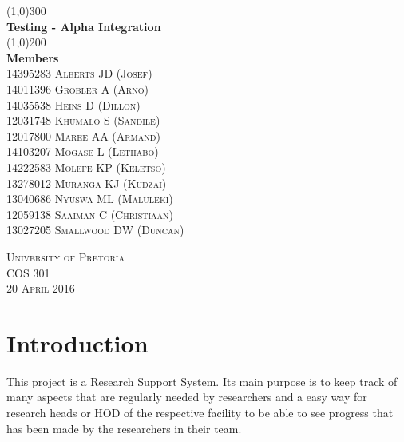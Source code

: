 \documentclass{article}
\begin{document}
\begin{titlepage}
	\begin{center}
		\line(1,0){300}\\
		[6mm]
		\huge{\bfseries Testing - Alpha Integration}\\
		[2mm]
		\line(1,0){200}\\
		[15mm]
		\textbf{\huge Members}\\
		[7.5mm]
		\textsc{
                \large 14395283	Alberts	JD (Josef)\\
                14011396	Grobler	A (Arno) \\
				14035538	Heins	D (Dillon)\\
				12031748	Khumalo	S (Sandile)\\
				12017800	Maree	AA (Armand)\\
                14103207	Mogase	L (Lethabo)\\
                14222583	Molefe	KP (Keletso)\\
                13278012	Muranga	KJ (Kudzai)\\
                13040686	Nyuswa	ML (Maluleki)\\
                12059138	Saaiman	C (Christiaan)\\
                13027205	Smallwood	DW (Duncan)\\[8cm]
            }
    \end{center}

    \begin{flushright}
        \textsc{\large University of Pretoria\\
        COS 301\\
        20 April 2016\\}
    \end{flushright}
\end{titlepage}

\tableofcontents
\thispagestyle{empty}
\cleardoublepage
%

\setcounter{page}{1}
%

\section{Introduction}\label{sec:intro}
    This project is a Research Support System. Its main purpose is to keep track of many aspects that are regularly needed by researchers and a easy way for research heads or HOD of the respective facility to be able to see progress that has been made by the researchers in their team.
    
\end{document}
